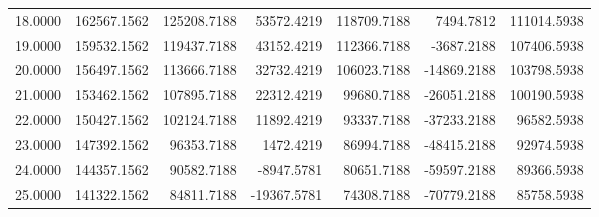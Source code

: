 \begin{table}
\begin{tabular}{lrrrrrr}
18.0000 & 162567.1562 & 125208.7188 & 53572.4219 & 118709.7188 & 7494.7812 & 111014.5938 \\
19.0000 & 159532.1562 & 119437.7188 & 43152.4219 & 112366.7188 & -3687.2188 & 107406.5938 \\
20.0000 & 156497.1562 & 113666.7188 & 32732.4219 & 106023.7188 & -14869.2188 & 103798.5938 \\
21.0000 & 153462.1562 & 107895.7188 & 22312.4219 & 99680.7188 & -26051.2188 & 100190.5938 \\
22.0000 & 150427.1562 & 102124.7188 & 11892.4219 & 93337.7188 & -37233.2188 & 96582.5938 \\
23.0000 & 147392.1562 & 96353.7188 & 1472.4219 & 86994.7188 & -48415.2188 & 92974.5938 \\
24.0000 & 144357.1562 & 90582.7188 & -8947.5781 & 80651.7188 & -59597.2188 & 89366.5938 \\
25.0000 & 141322.1562 & 84811.7188 & -19367.5781 & 74308.7188 & -70779.2188 & 85758.5938 \\
\bottomrule
\end{tabular}
\end{table}
